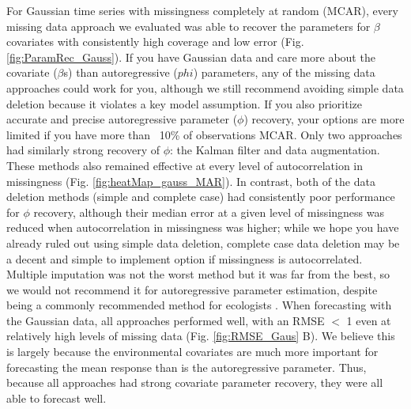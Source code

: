 \documentclass{article}
\begin{document}


For Gaussian time series with missingness completely at random (MCAR), every missing data approach we evaluated was able to recover the parameters for $\beta$ covariates with consistently high coverage and low error (Fig. \ref{fig:ParamRec_Gauss}). If you have Gaussian data and care more about the covariate ($\beta$s) than autoregressive ($phi$) parameters, any of the missing data approaches could work for you, although we still recommend avoiding simple data deletion because it violates a key model assumption. If you also prioritize accurate and precise autoregressive parameter ($\phi$) recovery, your options are more limited if you have more than ~10\% of observations MCAR. Only two approaches had similarly strong recovery of $\phi$: the Kalman filter and data augmentation. These methods also remained effective at every level of autocorrelation in missingness (Fig. \ref{fig:heatMap_gauss_MAR}). In contrast, both of the data deletion methods (simple and complete case) had consistently poor performance for $\phi$ recovery, although their median error at a given level of missingness was reduced when autocorrelation in missingness was higher; while we hope you have already ruled out using simple data deletion, complete case data deletion may be a decent and simple to implement option if missingness is autocorrelated. Multiple imputation was not the worst method but it was far from the best, so we would not recommend it for autoregressive parameter estimation, despite being a commonly recommended method for ecologists \citep{nakagawa_missing_2008,ellington_using_2015}.  When forecasting with the Gaussian data, all approaches performed well, with an RMSE $<$ 1 even at relatively high levels of missing data (Fig. \ref{fig:RMSE_Gaus} B). We believe this is largely because the environmental covariates are much more important for forecasting the mean response than is the autoregressive parameter. Thus, because all approaches had strong covariate parameter recovery, they were all able to forecast well.
\end{document}
